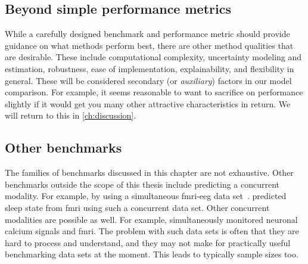 \subsection{Beyond simple performance metrics}

While a carefully designed benchmark and performance metric should provide guidance on what methods perform best, there are other method qualities that are desirable.
%
These include computational complexity, uncertainty modeling and estimation, robustness, ease of implementation, explainability, and flexibility in general.
%
These will be considered secondary (or \emph{auxiliary}) factors in our model comparison.
For example, it seems reasonable to want to sacrifice on performance slightly if it would get you many other attractive characteristics in return.
%
We will return to this in \cref{ch:discussion}.

\subsection{Other benchmarks}

The families of benchmarks discussed in this chapter are not exhaustive.
%
Other benchmarks outside the scope of this thesis include predicting a concurrent modality.
For example, by using a simultaneous \gls{fmri}-\gls{eeg} data set~\parencite{Laufs2003}.
\textcite{Tagliazucchi2014} predicted sleep state from \gls{fmri} using such a concurrent data set.
Other concurrent modalities are possible as well.
For example, \textcite{Matsui2016} simultaneously monitored neuronal calcium signals and \gls{fmri}.
%
The problem with such data sets is often that they are hard to process and understand, and they may not make for practically useful benchmarking data sets at the moment.
This leads to typically sample sizes too.
